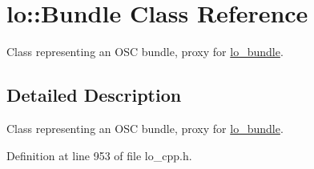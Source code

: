 \hypertarget{classlo_1_1Bundle}{\section{lo\+:\+:Bundle Class Reference}
\label{classlo_1_1Bundle}
}


Class representing an O\+S\+C bundle, proxy for \hyperlink{lo__types_8h_a96254950ad34e9cfbf8a6613fc74025b}{lo\+\_\+bundle}.  




\subsection{Detailed Description}
Class representing an O\+S\+C bundle, proxy for \hyperlink{lo__types_8h_a96254950ad34e9cfbf8a6613fc74025b}{lo\+\_\+bundle}. 

Definition at line 953 of file lo\+\_\+cpp.\+h.

